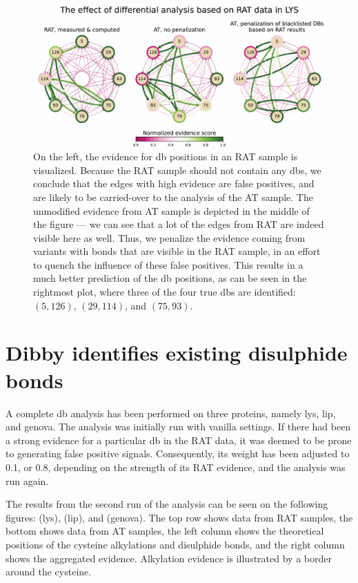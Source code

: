\begin{figure}
  \centering
  \includegraphics[width=1\linewidth]{img/pdfa-lys-at-rat-diff.pdf}
  \caption{On the left, the evidence for \gls*{db} positions in an RAT sample is visualized. Because the RAT sample should not contain any \glspl*{db}, we conclude that the edges with high evidence are false positives, and are likely to be carried-over to the analysis of the AT sample. The unmodified evidence from AT sample is depicted in the middle of the figure --- we can see that a lot of the edges from RAT are indeed visible here as well. Thus, we penalize the evidence coming from variants with bonds that are visible in the RAT sample, in an effort to quench the influence of these false positives. This results in a much better prediction of the \gls*{db} positions, as can be seen in the rightmost plot, where three of the four true \glspl*{db} are identified: \((5, 126)\), \((29, 114)\), and \((75, 93)\).}\label{fig:lys-at-rat-diff}
\end{figure}

\section{Dibby identifies existing disulphide bonds}

A complete \gls*{db} analysis has been performed on three proteins, namely \gls*{lys}, \gls*{lip}, and \gls*{genova}\@. The analysis was initially run with vanilla settings. If there had been a strong evidence for a particular \gls*{db} in the RAT data, it was deemed to be prone to generating false positive signals. Consequently, its weight has been adjusted to 0.1, or 0.8, depending on the strength of its RAT evidence, and the analysis was run again.

The results from the second run of the analysis can be seen on the following figures:  (\gls*{lys}),  (\gls*{lip}), and  (\gls*{genova}). The top row shows data from RAT samples, the bottom shows data from AT samples, the left column shows the theoretical positions of the cysteine alkylations and disulphide bonds, and the right column shows the aggregated evidence. Alkylation evidence is illustrated by a border around the cysteine.

